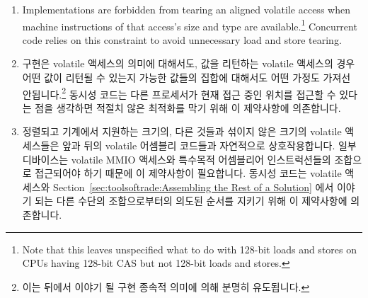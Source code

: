 {{{{\begin{enumerate}
\item	Implementations are forbidden from tearing an aligned volatile
	access when machine instructions of that access's size and type
	are available.\footnote{
		Note that this leaves unspecified what to do with 128-bit
		loads and stores on CPUs having 128-bit CAS but not
		128-bit loads and stores.}
	Concurrent code relies on this constraint to avoid unnecessary
	load and store tearing.
\fi
\item	구현은 volatile 액세스의 의미에 대해서도, 값을 리턴하는 volatile
	액세스의 경우 어떤 값이 리턴될 수 있는지 가능한 값들의 집합에 대해서도
	어떤 가정도 가져선 안됩니다.\footnote{
		이는 뒤에서 이야기 될 구현 종속적 의미에 의해 분명히
		유도됩니다.}
	동시성 코드는 다른 프로세서가 현재 접근 중인 위치를 접근할 수 있다는
	점을 생각하면 적절치 않은 최적화를 막기 위해 이 제약사항에 의존합니다.

\item	정렬되고 기계에서 지원하는 크기의, 다른 것들과 섞이지 않은 크기의
	volatile 액세스들은 앞과 뒤의 volatile 어셈블리 코드들과 자연적으로
	상호작용합니다.
	일부 디바이스는 volatile MMIO 액세스와 특수목적 어셈블리어
	인스트럭션들의 조합으로 접근되어야 하기 때문에 이 제약사항이
	필요합니다.
	동시성 코드는 volatile 액세스와
	Section~\ref{sec:toolsoftrade:Assembling the Rest of a Solution}
	에서 이야기 되는 다른 수단의 조합으로부터의 의도된 순서를 지키기 위해
	이 제약사항에 의존합니다.

\end{enumerate}

}}}}
